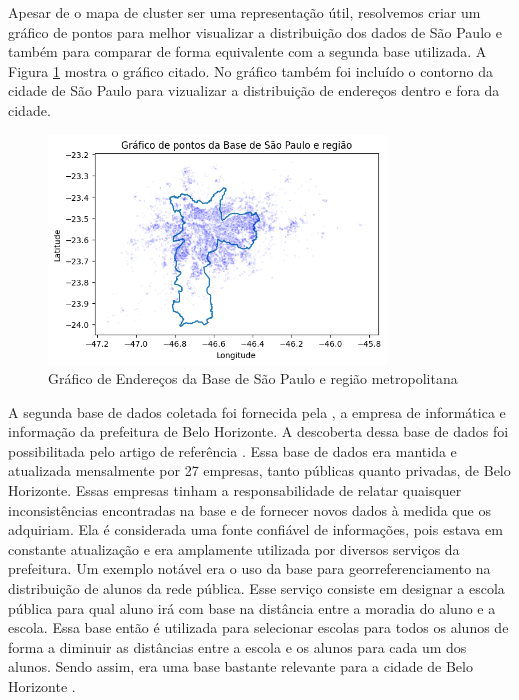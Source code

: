 Apesar de o mapa de cluster ser uma representação útil, resolvemos criar um gráfico de pontos para melhor visualizar a distribuição dos dados de São Paulo e também para comparar de forma equivalente com a segunda base utilizada. A Figura \ref{fig:baseSP} mostra o gráfico citado. No gráfico também foi incluído o contorno da cidade de São Paulo para vizualizar a distribuição de endereços dentro e fora da cidade.

\begin{figure} 
    \centering
    \includegraphics[width=0.8\textwidth]{Figuras/spCompleta.png}
    \caption{Gráfico de Endereços da Base de São Paulo e região metropolitana}
    \label{fig:baseSP}
\end{figure}


A segunda base de dados coletada foi fornecida pela \cite{Prodabel}, a empresa de informática e informação da prefeitura de Belo Horizonte. A descoberta dessa base de dados foi possibilitada pelo artigo de referência \cite{Clodoveu2011}. Essa base de dados era mantida e atualizada mensalmente por 27 empresas, tanto públicas quanto privadas, de Belo Horizonte. Essas empresas tinham a responsabilidade de relatar quaisquer inconsistências encontradas na base e de fornecer novos dados à medida que os adquiriam. Ela é considerada uma fonte confiável de informações, pois estava em constante atualização e era amplamente utilizada por diversos serviços da prefeitura. Um exemplo notável era o uso da base para georreferenciamento na distribuição de alunos da rede pública. Esse serviço consiste em designar a escola pública para qual aluno irá com base na distância entre a moradia do aluno e a escola. Essa base então é utilizada para selecionar escolas para todos os alunos de forma a diminuir as distâncias entre a escola e os alunos para cada um dos alunos. Sendo assim, era uma base bastante relevante para a cidade de Belo Horizonte \cite{Clodoveu2011}.

